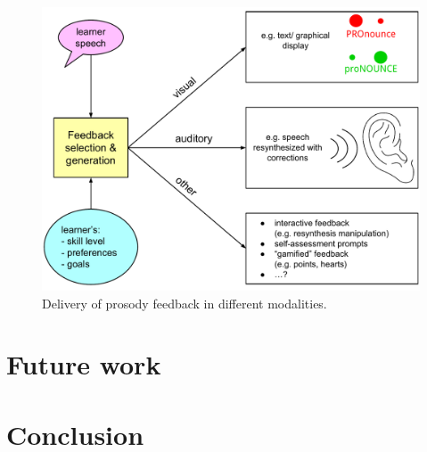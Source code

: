 \begin{figure}[htb]
	\includegraphics[width=\textwidth]{../img/feedback}
	\caption{Delivery of prosody feedback in different modalities.}
	\label{fig:feedback}
\end{figure}


\section{Future work}
\blindtext

\section{Conclusion}
\blindtext

%
%
%
%
